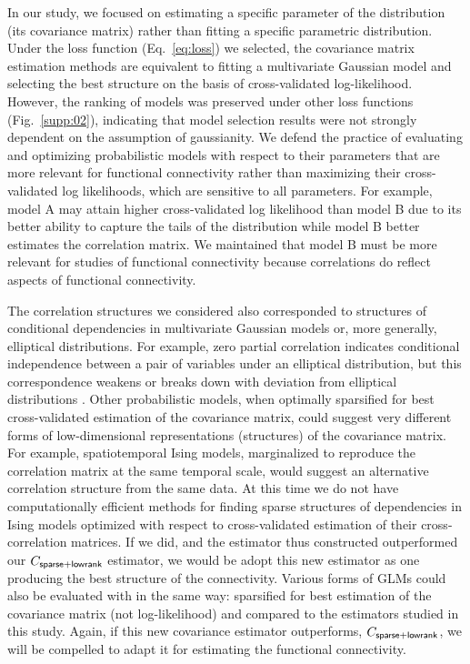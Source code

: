 \documentclass[10pt]{article}
\begin{document}
In our study, we focused on estimating a specific parameter of the distribution (its covariance matrix) rather than fitting a specific parametric distribution.  Under the loss function (Eq.~\ref{eq:loss}) we selected, the covariance matrix estimation methods are equivalent to fitting a multivariate Gaussian model and selecting the best structure on the basis of cross-validated log-likelihood. However, the ranking of models was preserved under other loss functions (Fig.~\ref{supp:02}), indicating that model selection results were not strongly dependent on the assumption of gaussianity. We defend the practice of evaluating and optimizing probabilistic models with respect to their parameters that are more relevant for functional connectivity rather than maximizing their cross-validated log likelihoods, which are sensitive to all parameters. For example, model A may attain higher cross-validated log likelihood than model B due to its better ability to capture the tails of the distribution while model B better estimates the correlation matrix. We maintained that model B must be more relevant for studies of functional connectivity because correlations do reflect aspects of functional connectivity.

The correlation structures we considered also corresponded to structures of conditional dependencies in multivariate Gaussian models or, more generally, elliptical distributions. For example, zero partial correlation indicates conditional independence between a pair of variables under an elliptical distribution, but this correspondence weakens or breaks down with deviation from elliptical distributions \cite{Loh:2012}.  Other probabilistic models, when optimally sparsified for best cross-validated estimation of the covariance matrix, could suggest very different forms of low-dimensional representations (structures) of the covariance matrix. For example, spatiotemporal Ising models, marginalized to reproduce the correlation matrix at the same temporal scale, would suggest an alternative correlation structure from the same data. At this time we do not have computationally efficient methods for finding sparse structures of dependencies in Ising models optimized with respect to cross-validated estimation of their cross-correlation matrices. If we did, and the estimator thus constructed outperformed our $C_{\sf sparse+lowrank}$ estimator, we would be adopt this new estimator as one producing the best structure of the connectivity. Various forms of GLMs could also be evaluated with in the same way: sparsified for best estimation of the covariance matrix (not log-likelihood) and compared to the estimators studied in this study.  Again, if this new covariance estimator outperforms, $C_{\sf sparse+lowrank}$, we will be compelled to adapt it for estimating the functional connectivity.
\end{document}
